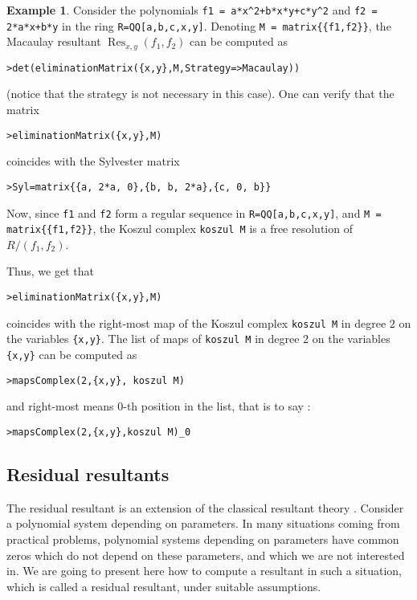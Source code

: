 \documentclass[10pt]{amsart}
\theoremstyle{plain}
\theoremstyle{definition}
\newtheorem{exmp}[thm]{Example}
\DeclareMathOperator\Res{Res}
\begin{document}
\begin{exmp}\label{exmpMacRes}
Consider the polynomials \texttt{f1 = a*x\^{}2+b*x*y+c*y\^{}2} and \texttt{f2 = 2*a*x+b*y} in the ring \texttt{R=QQ[a,b,c,x,y]}. 
Denoting \texttt{M = matrix\{\{f1,f2\}\}}, the Macaulay resultant $\Res_{x,y}(f_1,f_2)$ can be computed as 
\begin{verbatim}
>det(eliminationMatrix({x,y},M,Strategy=>Macaulay))
\end{verbatim}
(notice that the strategy is not necessary in this case). 
One can verify that the matrix 
\begin{verbatim}
>eliminationMatrix({x,y},M)
\end{verbatim}
coincides with the Sylvester matrix 
\begin{verbatim}
>Syl=matrix{{a, 2*a, 0},{b, b, 2*a},{c, 0, b}}
\end{verbatim}

\medskip

Now, since  \texttt{f1} and \texttt{f2} form a regular sequence in \texttt{R=QQ[a,b,c,x,y]}, and \texttt{M = matrix\{\{f1,f2\}\}}, the Koszul complex \texttt{koszul M} is a free resolution of $R/(f_1,f_2)$.

Thus, we get that 
\begin{verbatim}
>eliminationMatrix({x,y},M)
\end{verbatim}
 coincides with the right-most map of the Koszul complex \texttt{koszul M} in degree $2$ on the variables \texttt{\{x,y\}}. The list of maps of \texttt{koszul M} in degree $2$ on the variables \texttt{\{x,y\}} can be computed as
\begin{verbatim}
>mapsComplex(2,{x,y}, koszul M)	
\end{verbatim}
and right-most means $0$-th position in the list, that is to say :
\begin{verbatim}
>mapsComplex(2,{x,y},koszul M)_0	
\end{verbatim}
\end{exmp}


\subsection{Residual resultants}
The residual resultant is an extension of the classical
resultant theory \cite{BEM00,BEM01,Bus01,BusPhD}. Consider a polynomial system
depending on parameters. In many situations coming from practical
problems, polynomial systems 
depending on parameters have common zeros which do not depend on these 
parameters, and which we are not interested in. We are going to
present here how to compute a resultant in such a situation, which is called
a residual resultant, under suitable assumptions. 
 
\end{document}
